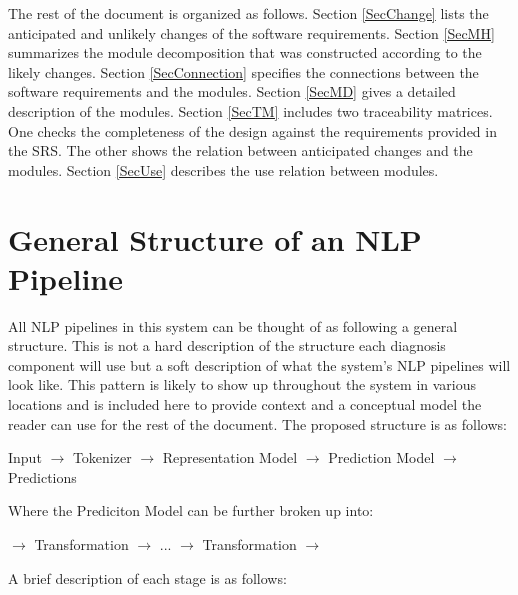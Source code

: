 \documentclass[12pt, titlepage]{article}
\begin{document}
The rest of the document is organized as follows. Section
\ref{SecChange} lists the anticipated and unlikely changes of the software
requirements. Section \ref{SecMH} summarizes the module decomposition that
was constructed according to the likely changes. Section \ref{SecConnection}
specifies the connections between the software requirements and the
modules. Section \ref{SecMD} gives a detailed description of the
modules. Section \ref{SecTM} includes two traceability matrices. One checks
the completeness of the design against the requirements provided in the SRS. The
other shows the relation between anticipated changes and the modules. Section
\ref{SecUse} describes the use relation between modules.

\section{General Structure of an NLP Pipeline} \label{SecPipeline}

All NLP pipelines in this system can be thought of as following a general structure. This is not a hard description of the structure each diagnosis component will use but a soft description of what the system's NLP pipelines will look like. This pattern is likely to show up throughout the system in various locations and is included here to provide context and a conceptual model the reader can use for the rest of the document. The proposed structure is as follows: \newline

\noindent Input $\rightarrow$ Tokenizer $\rightarrow$ Representation Model $\rightarrow$ Prediction Model $\rightarrow$ Predictions \newline

\noindent Where the Prediciton Model can be further broken up into: \newline

\noindent $\rightarrow$ Transformation $\rightarrow$ ... $\rightarrow$ Transformation $\rightarrow$ \newline

\noindent A brief description of each stage is as follows:
\end{document}
